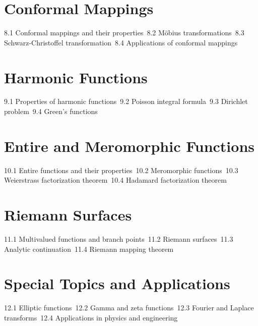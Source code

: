 \section{Conformal Mappings}
8.1 Conformal mappings and their properties\
8.2 Möbius transformations\
8.3 Schwarz-Christoffel transformation\
8.4 Applications of conformal mappings\
\section{Harmonic Functions}
9.1 Properties of harmonic functions\
9.2 Poisson integral formula\
9.3 Dirichlet problem\
9.4 Green's functions\
\section{Entire and Meromorphic Functions}
10.1 Entire functions and their properties\
10.2 Meromorphic functions\
10.3 Weierstrass factorization theorem\
10.4 Hadamard factorization theorem\
\section{Riemann Surfaces}
11.1 Multivalued functions and branch points\
11.2 Riemann surfaces\
11.3 Analytic continuation\
11.4 Riemann mapping theorem\
\section{Special Topics and Applications}
12.1 Elliptic functions\
12.2 Gamma and zeta functions\
12.3 Fourier and Laplace transforms\
12.4 Applications in physics and engineering\
